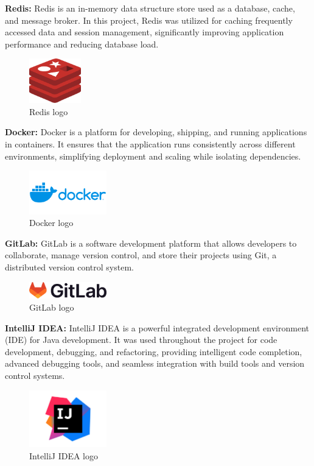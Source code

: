 \textbf{Redis:}
Redis is an in-memory data structure store used as a database, cache, and message broker. In this project, Redis was utilized for caching frequently accessed data and session management, significantly improving application performance and reducing database load.
\begin{figure}[H]
\centering
\includegraphics[width=0.2\textwidth]{img/tech/redis-logo.png}
\caption{Redis logo}
\end{figure}

\textbf{Docker:}
Docker is a platform for developing, shipping, and running applications in containers. It ensures that the application runs consistently across different environments, simplifying deployment and scaling while isolating dependencies.
\begin{figure}[H]
\centering
\includegraphics[width=0.3\textwidth]{img/tech/docker-logo.png}
\caption{Docker logo}
\end{figure}

\textbf{GitLab:}
GitLab is a software development platform that allows developers to collaborate, manage version control, and store their projects using Git, a distributed version control system.
\begin{figure}[H]
\centering
\includegraphics[width=0.3\textwidth]{img/logos/gitlab-logo.png}
\caption{GitLab logo}
\end{figure}

\textbf{IntelliJ IDEA:}
IntelliJ IDEA is a powerful integrated development environment (IDE) for Java development. It was used throughout the project for code development, debugging, and refactoring, providing intelligent code completion, advanced debugging tools, and seamless integration with build tools and version control systems.
\begin{figure}[H]
\centering
\includegraphics[width=0.3\textwidth]{img/tech/IntelliJ IDEA.png}
\caption{IntelliJ IDEA logo}
\end{figure}


